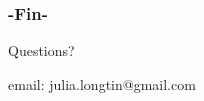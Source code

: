 \documentclass[hyperref={pdfpagemode=FullScreen},aspectratio=169]{beamer}
\begin{document}
\begin{frame}
\frametitle{-Fin-}
\Huge{\centerline{Questions?}}
\large{email: julia.longtin@gmail.com}
\end{frame}



\end{document}
